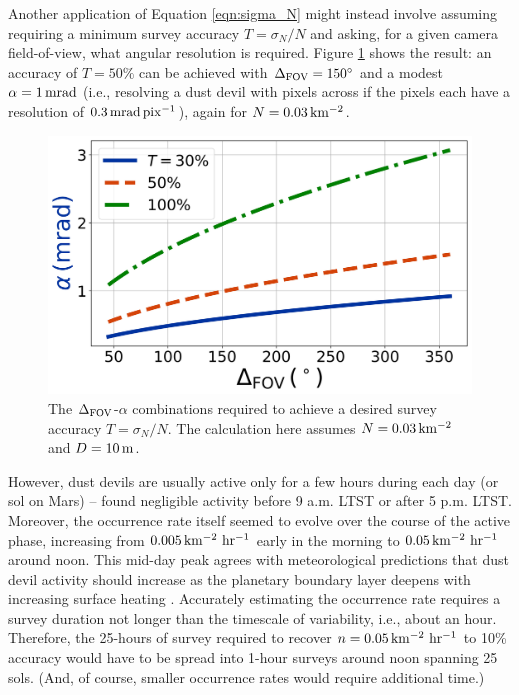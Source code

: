 \documentclass{aastex63}
\begin{document}
Another application of Equation \ref{eqn:sigma_N} might instead involve assuming requiring a minimum survey accuracy $T = \sigma_N/N$ and asking, for a given camera field-of-view, what angular resolution is required. Figure \ref{fig:alpha_vs_Delta} shows the result: an accuracy of $T = 50\%$ can be achieved with $\Delta_{\rm FOV} = 150^\circ$ and a modest $\alpha = 1\,{\rm mrad}$ (i.e., resolving a dust devil with pixels across if the pixels each have a resolution of $0.3\,{\rm mrad\, pix^{-1}}$), again for $N = 0.03\,{\rm km^{-2}}$.

\begin{figure}
    \centering
    \includegraphics[width=\textwidth]{figures/alpha_vs_Delta.jpg}
    \caption{The $\Delta_{\rm FOV}$-$\alpha$ combinations required to achieve a desired survey accuracy $T = \sigma_N/N$. The calculation here assumes $N = 0.03\,{\rm km^{-2}}$ and $D = 10\,{\rm m}$.}
    \label{fig:alpha_vs_Delta}
\end{figure}

However, dust devils are usually active only for a few hours during each day (or sol on Mars) -- \citet{2006JGRE..11112S09G} found negligible activity before 9 a.m. LTST or after 5 p.m. LTST. Moreover, the occurrence rate itself seemed to evolve over the course of the active phase, increasing from $0.005\,{\rm km^{-2}\ hr^{-1}}$ early in the morning to  $0.05\,{\rm km^{-2}\ hr^{-1}}$ around noon. This mid-day peak agrees with meteorological predictions that dust devil activity should increase as the planetary boundary layer deepens with increasing surface heating \citep{doi:10.1029/2010RG000351}. Accurately estimating the occurrence rate requires a survey duration not longer than the timescale of variability, i.e., about an hour. Therefore, the 25-hours of survey required to recover $n = 0.05\,{\rm km^{-2}\ hr^{-1}}$ to 10\% accuracy would have to be spread into 1-hour surveys around noon spanning 25 sols. (And, of course, smaller occurrence rates would require additional time.) 
\end{document}
